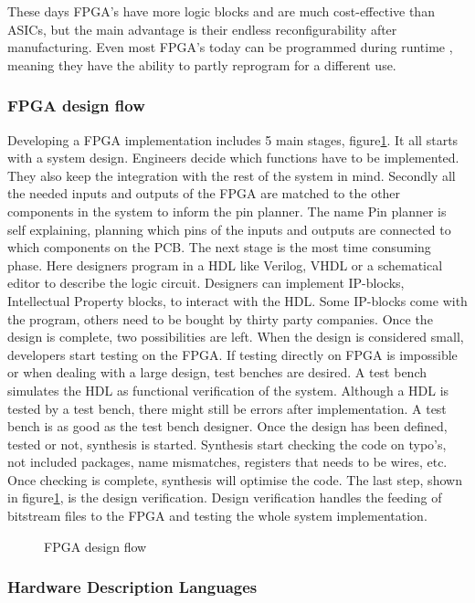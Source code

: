 \documentclass[12pt,a4paper,english,twoside,openright]{tutthesis}
\begin{document}
These days FPGA's have more logic blocks and are much cost-effective than ASICs, but the main advantage is their endless reconfigurability after manufacturing. Even most FPGA's today can be programmed during runtime \cite{FPGAruntimeProgramming}, meaning they have the ability to partly reprogram for a different use.
			\subsubsection{FPGA design flow}
Developing a FPGA implementation includes 5 main stages, figure\ref{fig:fpgaDesignFlow}. It all starts with a system design. Engineers decide which functions have to be implemented. They also keep the integration with the rest of the system in mind. Secondly all the needed inputs and outputs of the FPGA are matched to the other components in the system to inform the pin planner. The name Pin planner is self explaining, planning which pins of the inputs and outputs are connected to which components on the PCB. The next stage is the most time consuming phase. Here designers program in a HDL like Verilog, VHDL or a schematical editor to describe the logic circuit. Designers can implement IP-blocks, Intellectual Property blocks, to interact with the HDL. Some IP-blocks come with the program, others need to be bought by thirty party companies. Once the design is complete, two possibilities are left. When the design is considered small, developers start testing on the FPGA. If testing directly on FPGA is impossible or when dealing with a large design, test benches are desired. A test bench simulates the HDL as functional verification of the system. Although a HDL is tested by a test bench, there might still be errors after implementation. A test bench is as good as the test bench designer. Once the design has been defined, tested or not, synthesis is started. Synthesis start checking the code on typo's, not included packages, name mismatches, registers that needs to be wires, etc. Once checking is complete, synthesis will optimise the code. The last step, shown in figure\ref{fig:fpgaDesignFlow}, is the design verification. Design verification handles the feeding of bitstream files to the FPGA and testing the whole system implementation.
\begin{figure}\centering
	
	\caption{FPGA design flow}\label{fig:fpgaDesignFlow}
\end{figure}
			\subsubsection{Hardware Description Languages}
\end{document}
